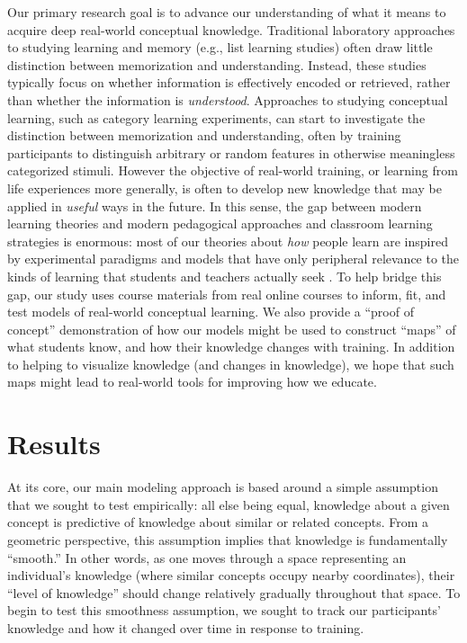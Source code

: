 \documentclass[10pt]{article}
\begin{document}
Our primary research goal is to advance our understanding of what it means to
acquire deep real-world conceptual knowledge. Traditional laboratory approaches
to studying learning and memory (e.g., list learning studies) often draw little
distinction between memorization and understanding. Instead, these studies
typically focus on whether information is effectively encoded or retrieved,
rather than whether the information is \textit{understood}. Approaches to
studying conceptual learning, such as category learning experiments, can start
to investigate the distinction between memorization and understanding, often by
training participants to distinguish arbitrary or random features in otherwise
meaningless categorized stimuli. However the objective of real-world training,
or learning from life experiences more generally, is often to develop new
knowledge that may be applied in \textit{useful} ways in the future. In this
sense, the gap between modern learning theories and modern pedagogical
approaches and classroom learning strategies is enormous: most of our theories
about \textit{how} people learn are inspired by experimental paradigms and
models that have only peripheral relevance to the kinds of learning that
students and teachers actually seek \citep{Macl05, HallGree08}. To help bridge this gap, our study uses
course materials from real online courses to inform, fit, and test models of
real-world conceptual learning. We also provide a ``proof of concept''
demonstration of how our models might be used to construct ``maps'' of what
students know, and how their knowledge changes with training. In addition to
helping to visualize knowledge (and changes in knowledge), we hope that such
maps might lead to real-world tools for improving how we educate.

\section*{Results}

At its core, our main modeling approach is based around a simple assumption
that we sought to test empirically: all else being equal, knowledge about a
given concept is predictive of knowledge about similar or related concepts.
From a geometric perspective, this assumption implies that knowledge is
fundamentally ``smooth.'' In other words, as one moves through a space
representing an individual's knowledge (where similar concepts occupy nearby
coordinates), their ``level of knowledge'' should change relatively gradually
throughout that space. To begin to test this smoothness assumption, we sought
to track our participants' knowledge and how it changed over time in response
to training.
\end{document}

